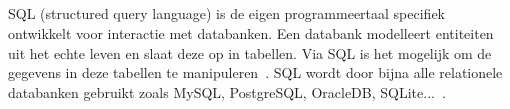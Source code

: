 \subsection{}
\label{subsec:SQL}

SQL (structured query language) is de eigen programmeertaal specifiek ontwikkelt voor interactie met databanken. Een databank modelleert entiteiten uit het echte leven en slaat deze op in tabellen. Via SQL is het mogelijk om de gegevens in deze tabellen te manipuleren~\autocite{Carchedi2020}. SQL wordt door bijna alle relationele databanken gebruikt zoals MySQL, PostgreSQL, OracleDB, SQLite...~\autocite{Codecademy}. 

\subsection{}
\label{subsec:Object-relationele databank}

